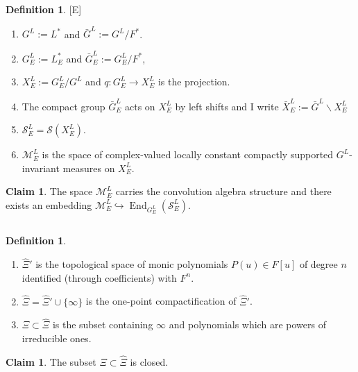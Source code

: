 \documentclass[11pt,a4paper,twoside]{amsart}
\theoremstyle{definition}
\newtheorem{definition}[theorem]{Definition}
\newtheorem{claim}[theorem]{Claim}
\newcommand{\mcM}{\mathcal M}
\newcommand{\mcS}{\mathcal S}
\newcommand{\ho}{\hookrightarrow}
\newcommand{\bsl}{\backslash}
\begin{document}
\begin{definition}\label{E}[E] \begin{enumerate}
\item  $G^L := L^\ast$ and $\bar G^L := G^L/F^\ast $.
\item $ G^L_E := L_E^\ast$ and $\bar G^L_E := G^L_E /F^\ast$,
\item  $ X^L_E := G^L_E /G^L$ and $q: G^L_E \to X^L_E $ is 	 the projection. 
\item The compact group $\bar G^L_E $ acts on $ X^L_E $ by left shifts and I write $\bar X^L_E := \bar G^L \bsl X^L_E$

\item $\mcS^L_E = \mcS (X^L_E)$.
\item $\mcM^L_E$ is  the space of complex-valued locally constant compactly supported $G^L$-invariant measures  on $ X^L_E $. 

\end{enumerate}

\end{definition}


\begin{claim} The space  $\mcM^L_E$ carries the convolution algebra structure and there exists an embedding $\mcM^L_E \ho \operatorname{End}_{G^L_E}( \mcS^L_E)$. 
\end{claim}

\subsection{}  

\begin{definition} 
\begin{enumerate}
\item $\hat \Xi '$ is the topological space of monic polynomials $P(u) \in F[u]$ of degree $n$ identified  (through coefficients) with $F^n$.
\item $\hat \Xi = \hat \Xi ' \cup \{\infty\}$ is the one-point compactification of $\hat \Xi '$.
\item $\Xi \subset \hat \Xi$ is the subset containing $\infty$ and polynomials which are powers of irreducible ones.

\end{enumerate}

\end{definition}

\begin{claim} 
The subset $\Xi \subset \hat \Xi$ is closed. 
\end{claim}
\end{document}
